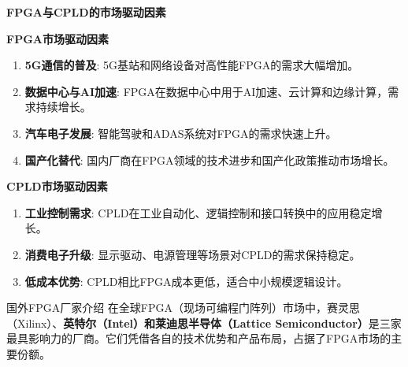 \documentclass[
  ignorenonframetext,
  chinese,
]{beamer}
\providecommand{\tightlist}{%
  \setlength{\itemsep}{0pt}\setlength{\parskip}{0pt}}
\begin{document}
\begin{frame}{\textbf{FPGA与CPLD的市场驱动因素}}
\label{fpgaux4e0ecpldux7684ux5e02ux573aux9a71ux52a8ux56e0ux7d20}
\begin{block}{\textbf{FPGA市场驱动因素}}
\label{fpgaux5e02ux573aux9a71ux52a8ux56e0ux7d20}
\begin{enumerate}
\tightlist
\item
  \textbf{5G通信的普及}: 5G基站和网络设备对高性能FPGA的需求大幅增加。\\
\item
  \textbf{数据中心与AI加速}:
  FPGA在数据中心中用于AI加速、云计算和边缘计算，需求持续增长。\\
\item
  \textbf{汽车电子发展}: 智能驾驶和ADAS系统对FPGA的需求快速上升。\\
\item
  \textbf{国产化替代}:
  国内厂商在FPGA领域的技术进步和国产化政策推动市场增长。
\end{enumerate}
\end{block}

\begin{block}{\textbf{CPLD市场驱动因素}}
\label{cpldux5e02ux573aux9a71ux52a8ux56e0ux7d20}
\begin{enumerate}
\tightlist
\item
  \textbf{工业控制需求}:
  CPLD在工业自动化、逻辑控制和接口转换中的应用稳定增长。\\
\item
  \textbf{消费电子升级}:
  显示驱动、电源管理等场景对CPLD的需求保持稳定。\\
\item
  \textbf{低成本优势}: CPLD相比FPGA成本更低，适合中小规模逻辑设计。
\end{enumerate}
\end{block}
\end{frame}

\begin{frame}
\begin{block}{国外FPGA厂家介绍}
\label{ux56fdux5916fpgaux5382ux5bb6ux4ecbux7ecd}
在全球FPGA（现场可编程门阵列）市场中，赛灵思（Xilinx）、\textbf{英特尔（Intel）和莱迪思半导体（Lattice
Semiconductor）}是三家最具影响力的厂商。它们凭借各自的技术优势和产品布局，占据了FPGA市场的主要份额。
\end{block}
\end{frame}
\end{document}
